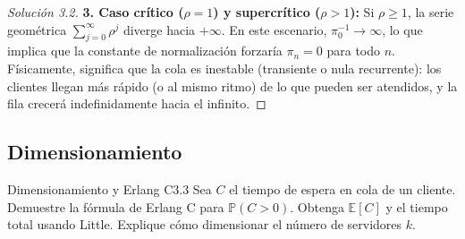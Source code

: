 \documentclass[10pt,a4paper]{article}
\begin{document}
\begin{proof}[Solución 3.2]
    \textbf{3. Caso crítico ($\rho = 1$) y supercrítico ($\rho > 1$):}
    Si $\rho \ge 1$, la serie geométrica $\sum_{j=0}^\infty \rho^j$ diverge hacia $+\infty$.
    En este escenario, $\pi_0^{-1} \to \infty$, lo que implica que la constante de normalización forzaría $\pi_n = 0$ para todo $n$.
    Físicamente, significa que la cola es inestable (transiente o nula recurrente): los clientes llegan más rápido (o al mismo ritmo) de lo que pueden ser atendidos, y la fila crecerá indefinidamente hacia el infinito.
\end{proof}

\newpage
\subsection{Dimensionamiento}

\begin{ejercicio}{Dimensionamiento y Erlang C}{3.3}
    Sea $C$ el tiempo de espera en cola de un cliente. Demuestre la fórmula de Erlang C para $\mathbb{P}(C>0)$. Obtenga $\mathbb{E}[C]$ y el tiempo total usando Little. Explique cómo dimensionar el número de servidores $k$.
\end{ejercicio}
\end{document}
